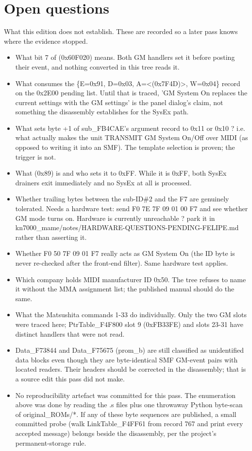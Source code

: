 \chapter{Open questions}
What this edition does not establish. These are recorded so a later pass knows where the evidence stopped.
\small
\begin{itemize}
\item What bit 7 of (0x60F020) means. Both GM handlers set it before posting their event, and nothing converted in this tree reads it.
\item What consumes the \{E=0x91, D=0x03, A=<(0x7F4D)>, W=0x04\} record on the 0x2E00 pending list. Until that is traced, 'GM System On replaces the current settings with the GM settings' is the panel dialog's claim, not something the disassembly establishes for the SysEx path.
\item What sets byte +1 of sub\_FB4CAE's argument record to 0x11 or 0x10 ? i.e. what actually makes the unit TRANSMIT GM System On/Off over MIDI (as opposed to writing it into an SMF). The template selection is proven; the trigger is not.
\item What (0x89) is and who sets it to 0xFF. While it is 0xFF, both SysEx drainers exit immediately and no SysEx at all is processed.
\item Whether trailing bytes between the sub-ID\#2 and the F7 are genuinely tolerated. Needs a hardware test: send F0 7E 7F 09 01 00 F7 and see whether GM mode turns on. Hardware is currently unreachable ? park it in kn7000\_mame/notes/HARDWARE-QUESTIONS-PENDING-FELIPE.md rather than asserting it.
\item Whether F0 50 7F 09 01 F7 really acts as GM System On (the ID byte is never re-checked after the front-end filter). Same hardware test applies.
\item Which company holds MIDI manufacturer ID 0x50. The tree refuses to name it without the MMA assignment list; the published manual should do the same.
\item What the Matsushita commands 1-33 do individually. Only the two GM slots were traced here; PtrTable\_F4F800 slot 9 (0xFB33FE) and slots 23-31 have distinct handlers that were not read.
\item Data\_F73844 and Data\_F75675 (prom\_b) are still classified as unidentified data blocks even though they are byte-identical SMF GM-event pairs with located readers. Their headers should be corrected in the disassembly; that is a source edit this pass did not make.
\item No reproducibility artefact was committed for this pass. The enumeration above was done by reading the .s files plus one throwaway Python byte-scan of original\_ROMs/*. If any of these byte sequences are published, a small committed probe (walk LinkTable\_F4FF61 from record 767 and print every accepted message) belongs beside the disassembly, per the project's permanent-storage rule.

\end{itemize}

